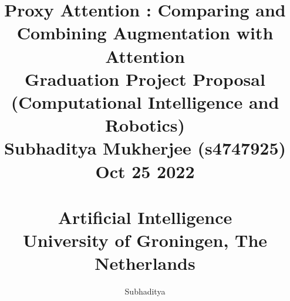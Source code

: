 \documentclass[a4paper,12pt]{article}
\author{Subhaditya}
\begin{document}
\pagestyle{body}


\title{
    \vspace{1cm}
        {\bf
        {\Huge Proxy Attention : Comparing and Combining Augmentation with Attention\\
        }
        }
        \vspace{4mm}Graduation Project Proposal\\(Computational Intelligence and Robotics)\\
        \vspace{4mm}Subhaditya Mukherjee (s4747925)\\Oct 25 2022\\
        \vspace{10cm}{\LARGE Internal Supervisor(s): S.H. Mohades Kasaei, PhD (Artificial Intelligence, University of Groningen)}\\
        {\bf {Artificial Intelligence\\University of Groningen, The Netherlands}}
}
\date{}

\maketitle
\thispagestyle{titlepage}





    
\end{document}
